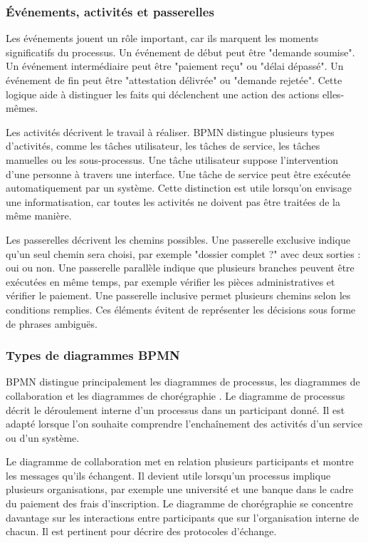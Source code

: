 \subsubsection{Événements, activités et passerelles}

Les événements jouent un rôle important, car ils marquent les moments significatifs du processus. Un événement de début peut être "demande soumise". Un événement intermédiaire peut être "paiement reçu" ou "délai dépassé". Un événement de fin peut être "attestation délivrée" ou "demande rejetée". Cette logique aide à distinguer les faits qui déclenchent une action des actions elles-mêmes.

Les activités décrivent le travail à réaliser. BPMN distingue plusieurs types d'activités, comme les tâches utilisateur, les tâches de service, les tâches manuelles ou les sous-processus. Une tâche utilisateur suppose l'intervention d'une personne à travers une interface. Une tâche de service peut être exécutée automatiquement par un système. Cette distinction est utile lorsqu'on envisage une informatisation, car toutes les activités ne doivent pas être traitées de la même manière.

Les passerelles décrivent les chemins possibles. Une passerelle exclusive indique qu'un seul chemin sera choisi, par exemple "dossier complet ?" avec deux sorties : oui ou non. Une passerelle parallèle indique que plusieurs branches peuvent être exécutées en même temps, par exemple vérifier les pièces administratives et vérifier le paiement. Une passerelle inclusive permet plusieurs chemins selon les conditions remplies. Ces éléments évitent de représenter les décisions sous forme de phrases ambiguës.

\subsubsection{Types de diagrammes BPMN}

BPMN distingue principalement les diagrammes de processus, les diagrammes de collaboration et les diagrammes de chorégraphie \cite{omg2013bpmn}. Le diagramme de processus décrit le déroulement interne d'un processus dans un participant donné. Il est adapté lorsque l'on souhaite comprendre l'enchaînement des activités d'un service ou d'un système.

Le diagramme de collaboration met en relation plusieurs participants et montre les messages qu'ils échangent. Il devient utile lorsqu'un processus implique plusieurs organisations, par exemple une université et une banque dans le cadre du paiement des frais d'inscription. Le diagramme de chorégraphie se concentre davantage sur les interactions entre participants que sur l'organisation interne de chacun. Il est pertinent pour décrire des protocoles d'échange.


